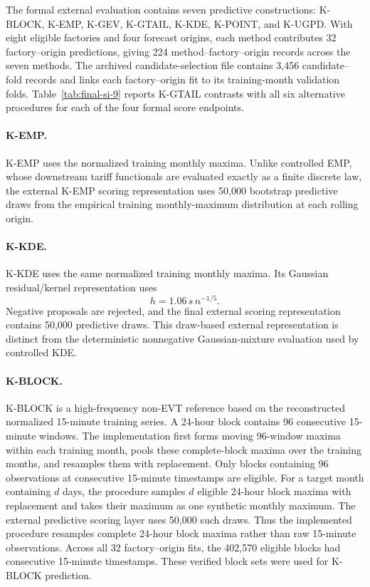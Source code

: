 \documentclass[]{interact}
\begin{document}
The formal external evaluation contains seven predictive
constructions:
K-BLOCK, K-EMP, K-GEV, K-GTAIL, K-KDE, K-POINT, and K-UGPD.
With eight eligible factories and four forecast origins, each method
contributes 32 factory--origin predictions, giving 224
method--factory--origin records across the seven methods. The archived
candidate-selection file contains 3,456 candidate--fold records and
links each factory--origin fit to its training-month validation folds.
Table~\ref{tab:final-si-9}
reports K-GTAIL contrasts with all six alternative procedures for each
of the four formal score endpoints.

\paragraph*{K-EMP.}

K-EMP uses the normalized training monthly maxima. Unlike controlled
EMP, whose downstream tariff functionals are evaluated exactly as a
finite discrete law, the external K-EMP scoring representation uses
50,000 bootstrap predictive draws from the empirical training
monthly-maximum distribution at each rolling origin.

\paragraph*{K-KDE.}

K-KDE uses the same normalized training monthly maxima. Its Gaussian
residual/kernel representation uses
\[
h=1.06\,s\,n^{-1/5}.
\]
Negative proposals are rejected, and the final external scoring
representation contains 50,000 predictive draws. This draw-based
external representation is distinct from the deterministic
nonnegative Gaussian-mixture evaluation used by controlled KDE.

\paragraph*{K-BLOCK.}

K-BLOCK is a high-frequency non-EVT reference based on the
reconstructed normalized 15-minute training series. A 24-hour block
contains 96 consecutive 15-minute windows. The implementation first
forms moving 96-window maxima within each training month, pools these
complete-block maxima over the training months, and resamples them with
replacement. Only blocks containing 96 observations at consecutive
15-minute timestamps are eligible. For a target month containing $d$
days, the procedure samples $d$ eligible 24-hour block maxima with
replacement and takes their maximum as one synthetic monthly maximum.
The external predictive scoring layer uses 50,000 such draws. Thus the
implemented procedure resamples complete 24-hour block maxima rather
than raw 15-minute observations.
Across all 32 factory--origin fits, the 402,570 eligible blocks had
consecutive 15-minute timestamps. These verified block sets were used
for K-BLOCK prediction.
\end{document}
